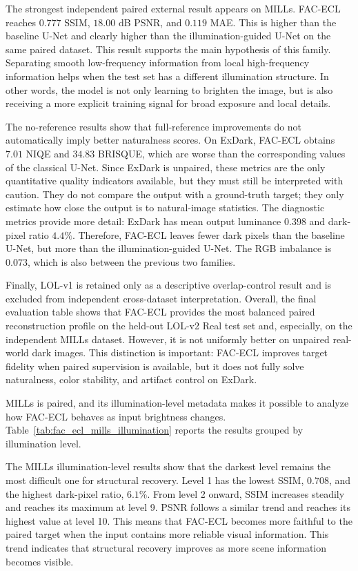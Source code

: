 The strongest independent paired external result appears on MILLs. FAC-ECL reaches $0.777$ SSIM, $18.00$ dB PSNR, and $0.119$ MAE. This is higher than the baseline U-Net and clearly higher than the illumination-guided U-Net on the same paired dataset. This result supports the main hypothesis of this family. Separating smooth low-frequency information from local high-frequency information helps when the test set has a different illumination structure. In other words, the model is not only learning to brighten the image, but is also receiving a more explicit training signal for broad exposure and local details.

The no-reference results show that full-reference improvements do not automatically imply better naturalness scores. On ExDark, FAC-ECL obtains $7.01$ NIQE and $34.83$ BRISQUE, which are worse than the corresponding values of the classical U-Net. Since ExDark is unpaired, these metrics are the only quantitative quality indicators available, but they must still be interpreted with caution. They do not compare the output with a ground-truth target; they only estimate how close the output is to natural-image statistics. The diagnostic metrics provide more detail: ExDark has mean output luminance $0.398$ and dark-pixel ratio $4.4\%$. Therefore, FAC-ECL leaves fewer dark pixels than the baseline U-Net, but more than the illumination-guided U-Net. The RGB imbalance is $0.073$, which is also between the previous two families.

Finally, LOL-v1 is retained only as a descriptive overlap-control result and is excluded from independent cross-dataset interpretation. Overall, the final evaluation table shows that FAC-ECL provides the most balanced paired reconstruction profile on the held-out LOL-v2 Real test set and, especially, on the independent MILLs dataset. However, it is not uniformly better on unpaired real-world dark images. This distinction is important: FAC-ECL improves target fidelity when paired supervision is available, but it does not fully solve naturalness, color stability, and artifact control on ExDark.

MILLs is paired, and its illumination-level metadata makes it possible to analyze how FAC-ECL behaves as input brightness changes. Table~\ref{tab:fac_ecl_mills_illumination} reports the results grouped by illumination level.



The MILLs illumination-level results show that the darkest level remains the most difficult one for structural recovery. Level 1 has the lowest SSIM, $0.708$, and the highest dark-pixel ratio, $6.1\%$. From level 2 onward, SSIM increases steadily and reaches its maximum at level 9. PSNR follows a similar trend and reaches its highest value at level 10. This means that FAC-ECL becomes more faithful to the paired target when the input contains more reliable visual information. This trend indicates that structural recovery improves as more scene information becomes visible.

